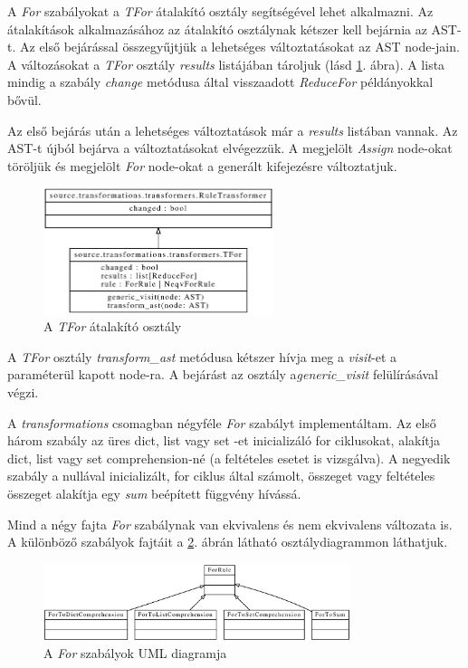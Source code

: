 A \emph{For} szabályokat a \emph{TFor} átalakító osztály segítségével lehet alkalmazni.
Az átalakítások alkalmazásához az átalakító osztálynak kétszer kell bejárnia az AST-t.
Az első bejárással összegyűjtjük a lehetséges változtatásokat az AST node-jain.
A változásokat a \emph{TFor} osztály \emph{results} listájában tároljuk
(lásd \ref{fig:TFor}. ábra).
A lista mindig a szabály \emph{change} metódusa által visszaadott
\emph{ReduceFor} példányokkal bővül.

Az első bejárás után a lehetséges változtatások már a \emph{results} listában vannak.
Az AST-t újból bejárva a változtatásokat elvégezzük.
A megjelölt \emph{Assign} node-okat töröljük
és megjelölt \emph{For} node-okat a generált kifejezésre változtatjuk.

\begin{figure}[H]
	\centering
	\includegraphics[width=0.6\textwidth]{images/uml/TFor.eps}
	\caption{\label{fig:TFor}A \emph{TFor} átalakító osztály}
\end{figure}

A \emph{TFor} osztály \emph{transform\_ast} metódusa kétszer hívja
meg a \emph{visit}-et a paraméterül kapott node-ra.
A bejárást az osztály a\emph{generic\_visit} felülírásával végzi.

A \emph{transformations} csomagban négyféle \emph{For} szabályt implementáltam.
Az első három szabály az üres dict, list vagy set -et inicializáló for ciklusokat,
alakítja dict, list vagy set comprehension-né (a feltételes esetet is vizsgálva).
A negyedik szabály a nullával inicializált, for ciklus által számolt,
összeget vagy feltételes összeget alakítja egy \emph{sum} beépített függvény hívássá.

Mind a négy fajta \emph{For} szabálynak van ekvivalens és nem ekvivalens változata is.
A különböző szabályok fajtáit a \ref{fig:ForRules}. ábrán látható osztálydiagrammon láthatjuk.

\begin{figure}[H]
	\centering
	\includegraphics[width=0.8\textwidth]{images/uml/ForRules.eps}
	\caption{\label{fig:ForRules}A \emph{For} szabályok UML diagramja}
\end{figure}

